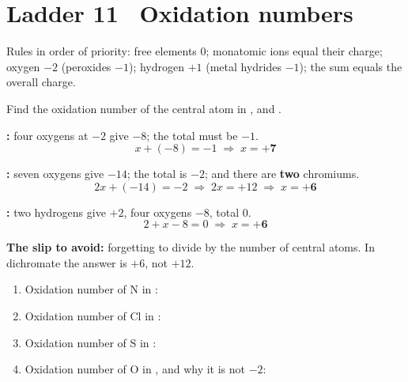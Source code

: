 \documentclass{apchem-worksheet}
\begin{document}
\section*{\sffamily Ladder 11 \textbullet\ Oxidation numbers}

Rules in order of priority: free elements 0; monatomic ions equal their
charge; oxygen $-2$ (peroxides $-1$); hydrogen $+1$ (metal hydrides
$-1$); the sum equals the overall charge.

\begin{workedexample}
Find the oxidation number of the central atom in ,
 and .

\textbf{:} four oxygens at $-2$ give $-8$; the total must be
$-1$.
\[ x + (-8) = -1 \;\Rightarrow\; x = \mathbf{+7} \]

\textbf{:} seven oxygens give $-14$; the total is $-2$; and
there are \textbf{two} chromiums.
\[ 2x + (-14) = -2 \;\Rightarrow\; 2x = +12 \;\Rightarrow\;
   x = \mathbf{+6} \]

\textbf{:} two hydrogens give $+2$, four oxygens $-8$, total 0.
\[ 2 + x - 8 = 0 \;\Rightarrow\; x = \mathbf{+6} \]

\textbf{The slip to avoid:} forgetting to divide by the number of central
atoms. In dichromate the answer is $+6$, not $+12$.
\end{workedexample}

\begin{yourturn}
\begin{enumerate}[leftmargin=*,itemsep=0.5em]
  \item Oxidation number of N in : \workspace[1.4cm]
  \item Oxidation number of Cl in : \workspace[1.4cm]
  \item Oxidation number of S in : \workspace[1.4cm]
  \item Oxidation number of O in , and why it is not $-2$:
        \workspace[1.8cm]
\end{enumerate}
\end{yourturn}
\end{document}
